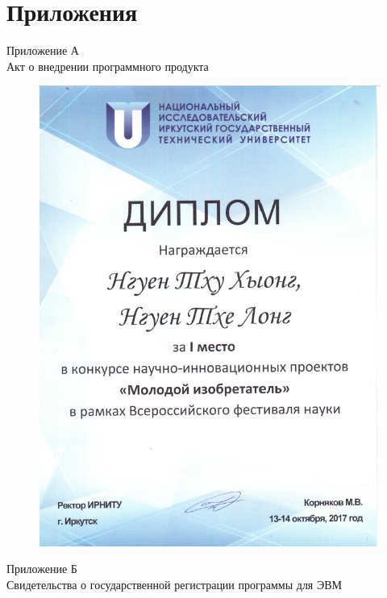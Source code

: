 \chapter*{Приложения}
\begin{center}
Приложение А  \\
Акт о внедрении программного продукта
\end{center}
\begin{figure}[ht!]
\centering
\includegraphics [width=0.8\linewidth] {images/h58.png}\label{img58}
\end{figure}
\begin{center}
Приложение Б\\
Свидетельства о государственной регистрации программы для ЭВМ
\end{center}
